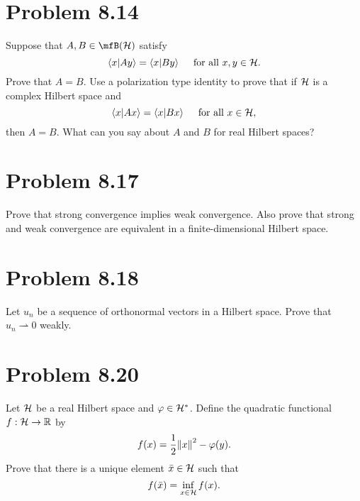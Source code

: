 \newpage
\section{Problem 8.14}
Suppose that $A, B \in \mfB (\scH)$ satisfy
\[\braket{x}{Ay} = \braket{x}{By} \quad \text{ for all } x, y \in \mathcal{H}.\]
Prove that $A = B$. Use a polarization type identity to prove that if $\mathcal{H}$ is a complex Hilbert space and 
\[\braket{x}{Ax} = \braket{x}{Bx} \quad \text{ for all } x\in \mathcal{H},\]
then $A = B$. What can you say about $A$ and $B$ for real Hilbert spaces?

\newpage
\section{Problem 8.17}
Prove that strong convergence implies weak convergence. Also prove that strong and weak convergence are equivalent in a finite-dimensional Hilbert space.

\newpage
\section{Problem 8.18}
Let $u_n$ be a sequence of orthonormal vectors in a Hilbert space. Prove that $u_n \rightharpoonup 0$ weakly.  


\newpage
\section{Problem 8.20}
\newcommand{\xbar}{\Bar{x}}
Let $\mathcal{H}$ be a real Hilbert space and $\varphi \in \mathcal{H}^{*}$. Define the quadratic functional $f: \mathcal{H} \rightarrow \mathbb{R}$ by 
\[f(x) = \frac{1}{2}\norm{x}^2 - \varphi(y).\]
Prove that there is a unique element $\xbar \in \scH$ such that 
\[f(\xbar) = \inf_{x \in \scH} f(x).\]

